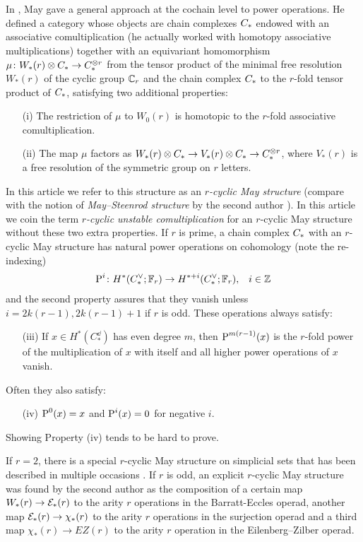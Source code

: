 In \cite{may1970general}, May gave a general approach at the cochain level to power operations.
He defined a category whose objects are chain complexes $C_{*}$ endowed with an associative comultiplication (he actually worked with homotopy associative multiplications) together with an equivariant homomorphism $\mu \colon  W_*(r) \otimes  C_{*}\to C_{*}^{ \otimes  r}$ from the tensor product of the minimal free resolution $W_*(r)$ of the cyclic group $\mathbb{C}_r$ and the chain complex $C_{*}$ to the $r$-fold tensor product of $C_{*}$, satisfying two additional properties:
\begin{itemize}
	\item[(i)] The restriction of $\mu$ to $W_0(r)$ is homotopic to the $r$-fold associative comultiplication.
	\item[(ii)] The map $\mu$ factors as $W_*(r) \otimes  C_{*} \to V_*(r) \otimes  C_{*}\to C_{*}^{ \otimes  r}$, where $V_*(r)$ is a free resolution of the symmetric group on $r$ letters.
\end{itemize}
In this article we refer to this structure as an \emph{$r$-cyclic May structure} (compare with the notion of \emph{May--Steenrod structure} by the second author \cite{medina2021may_st}).
In this article we coin the term \emph{$r$-cyclic unstable comultiplication} for an $r$-cyclic May structure without these two extra properties.
If $r$ is prime, a chain complex $C_{*}$ with an $r$-cyclic May structure has natural power operations on cohomology (note the re-indexing)
\begin{align*}
	\operatorname{P}^i \colon  H^*(C^\vee_{*};\mathbb{F}_r)&\to H^{*+i}(C^\vee_{*};\mathbb{F}_r), & i\in \mathbb{Z}
\end{align*}
and the second property assures that they vanish unless $i = 2k(r-1), 2k(r-1)+1$ if $r$ is odd.
These operations always satisfy:
\begin{itemize}
	\item[(iii)] If $x\in H^*(C_*^\dd)$ has even degree $m$, then $\operatorname{P}^{m(r-1)}(x)$ is the $r$-fold power of the multiplication of $x$ with itself and all higher power operations of $x$ vanish.
\end{itemize}
Often they also satisfy:
\begin{enumerate}
	\item[(iv)] $\operatorname{P}^0(x) = x$ and $\operatorname{P}^i(x) = 0$ for negative $i$.
\end{enumerate}
Showing Property (iv) tends to be hard to prove.

If $r=2$, there is a special $r$-cyclic May structure on simplicial sets that has been described in multiple occasions \cite{steenrod1947products,gonzalez-diaz1999steenrod,medina2021fast_sq}.
If $r$ is odd, an explicit $r$-cyclic May structure was found by the second author \cite{medina2021may_st} as the composition of a certain map $W_*(r)\to \mathcal{E}_*(r)$ to the arity $r$ operations in the Barratt-Eccles operad, another map $\mathcal{E}_*(r)\to \chi_*(r)$ to the arity $r$ operations in the surjection operad \cite{berger2004combinatorial} and a third map $\chi_*(r)\to EZ(r)$ to the arity $r$ operation in the Eilenberg--Zilber operad\cite{mcclure2003multivariable}.

